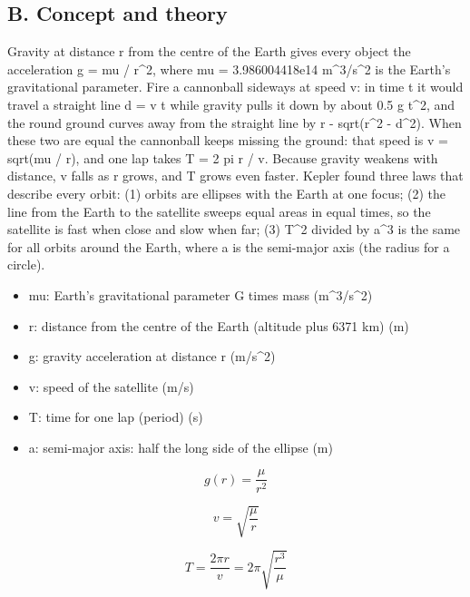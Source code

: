 \documentclass[11pt,a4paper]{article}
\begin{document}
\subsection*{B. Concept and theory}
Gravity at distance r from the centre of the Earth gives every object the acceleration g = mu / r\textasciicircum{}2, where mu = 3.986004418e14 m\textasciicircum{}3/s\textasciicircum{}2 is the Earth's gravitational parameter. Fire a cannonball sideways at speed v: in time t it would travel a straight line d = v t while gravity pulls it down by about 0.5 g t\textasciicircum{}2, and the round ground curves away from the straight line by r - sqrt(r\textasciicircum{}2 - d\textasciicircum{}2). When these two are equal the cannonball keeps missing the ground: that speed is v = sqrt(mu / r), and one lap takes T = 2 pi r / v. Because gravity weakens with distance, v falls as r grows, and T grows even faster. Kepler found three laws that describe every orbit: (1) orbits are ellipses with the Earth at one focus; (2) the line from the Earth to the satellite sweeps equal areas in equal times, so the satellite is fast when close and slow when far; (3) T\textasciicircum{}2 divided by a\textasciicircum{}3 is the same for all orbits around the Earth, where a is the semi-major axis (the radius for a circle).

\begin{itemize}[nosep]
\item mu: Earth's gravitational parameter G times mass (m\textasciicircum{}3/s\textasciicircum{}2)
\item r: distance from the centre of the Earth (altitude plus 6371 km) (m)
\item g: gravity acceleration at distance r (m/s\textasciicircum{}2)
\item v: speed of the satellite (m/s)
\item T: time for one lap (period) (s)
\item a: semi-major axis: half the long side of the ellipse (m)
\end{itemize}

\begin{equation*}
g(r)=\frac{\mu}{r^{2}}
\end{equation*}

\begin{equation*}
v=\sqrt{\frac{\mu}{r}}
\end{equation*}

\begin{equation*}
T=\frac{2\pi r}{v}=2\pi\sqrt{\frac{r^{3}}{\mu}}
\end{equation*}
\end{document}
